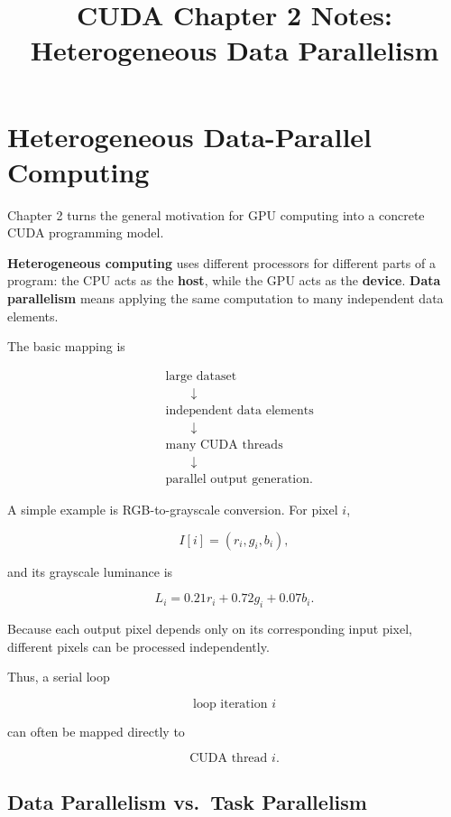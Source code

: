 \documentclass[11pt,a4paper]{article}
\title{CUDA Chapter 2 Notes: Heterogeneous Data Parallelism}
\author{}
\date{}
\begin{document}
\maketitle

\section{Heterogeneous Data-Parallel Computing}

Chapter 2 turns the general motivation for GPU computing into a concrete CUDA programming model.

\textbf{Heterogeneous computing} uses different processors for different parts of a program: the CPU acts as the \textbf{host}, while the GPU acts as the \textbf{device}. \textbf{Data parallelism} means applying the same computation to many independent data elements.

The basic mapping is

\[
\begin{aligned}
&\text{large dataset} \\
&\qquad\downarrow \\
&\text{independent data elements} \\
&\qquad\downarrow \\
&\text{many CUDA threads} \\
&\qquad\downarrow \\
&\text{parallel output generation}.
\end{aligned}
\]

A simple example is RGB-to-grayscale conversion. For pixel \(i\),

\[
I[i]=(r_i,g_i,b_i),
\]

and its grayscale luminance is

\[
L_i = 0.21r_i + 0.72g_i + 0.07b_i.
\]

Because each output pixel depends only on its corresponding input pixel, different pixels can be processed independently.

Thus, a serial loop

\[
\text{loop iteration }i
\]

can often be mapped directly to

\[
\text{CUDA thread }i.
\]

\subsection{Data Parallelism vs.\ Task Parallelism}
\end{document}
